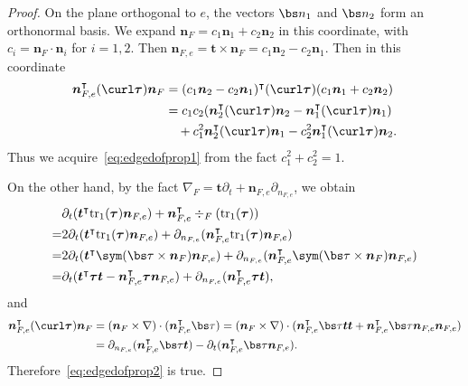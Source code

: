 \begin{proof}
On the plane orthogonal to $e$, the vectors $\bs n_1$ and $\bs n_2$ form an orthonormal basis. We expand $\boldsymbol n_F= c_1 \boldsymbol n_1+c_2\boldsymbol n_2$ in this coordinate, with $c_i = \boldsymbol n_F\cdot\boldsymbol n_i$ for $i=1,2$. Then $
\boldsymbol n_{F,e}=\boldsymbol t \times\boldsymbol n_{F}=c_1\boldsymbol n_2 - c_2 \boldsymbol n_1.$
Then in this coordinate
\begin{align*}
\boldsymbol n_{F,e}^{\intercal}(\curl\boldsymbol \tau)\boldsymbol n_F&=(c_1\boldsymbol n_2-c_2\boldsymbol n_1)^{\intercal}(\curl\boldsymbol \tau)(c_1\boldsymbol n_1+c_2\boldsymbol n_2) \\
&=c_1c_2(\boldsymbol n_{2}^{\intercal}(\curl\boldsymbol \tau)\boldsymbol n_2-\boldsymbol n_{1}^{\intercal}(\curl\boldsymbol \tau)\boldsymbol n_1) \\
&\quad+ c_1^2\boldsymbol n_{2}^{\intercal}(\curl\boldsymbol \tau)\boldsymbol n_1 - c_2^2\boldsymbol n_{1}^{\intercal}(\curl\boldsymbol \tau)\boldsymbol n_2.
\end{align*}
Thus we acquire~\eqref{eq:edgedofprop1} from the fact $c_1^2+c_2^2=1$.

On the other hand, by the fact $\nabla_F=\boldsymbol t\partial_{t}+\boldsymbol n_{F,e}\partial_{n_{F,e}}$, we obtain
\begin{align*}
&\partial_{t}(\boldsymbol t^{\intercal}{\rm tr}_1(\boldsymbol \tau)\boldsymbol  n_{F,e}) +\boldsymbol  n_{F,e}^{\intercal}\div_F({\rm tr}_1(\boldsymbol \tau)) \\
=&2\partial_{t}(\boldsymbol t^{\intercal}{\rm tr}_1(\boldsymbol \tau)\boldsymbol  n_{F,e}) + \partial_{n_{F,e}}(\boldsymbol  n_{F,e}^{\intercal} {\rm tr}_1(\boldsymbol \tau)\boldsymbol n_{F,e}) \\
=&2\partial_{t}(\boldsymbol  t^{\intercal} \sym(\bs\tau\times\boldsymbol n_F)\boldsymbol  n_{F,e}) + \partial_{n_{F,e}}(\boldsymbol  n_{F,e}^{\intercal} \sym(\bs\tau\times\boldsymbol n_F)\boldsymbol  n_{F,e}) \\
=&\partial_{t}(\boldsymbol t^{\intercal}\boldsymbol\tau\boldsymbol  t - \boldsymbol  n_{F,e}^{\intercal}\boldsymbol\tau\boldsymbol  n_{F,e}) + \partial_{n_{F,e}}(\boldsymbol n_{F,e}^{\intercal}\boldsymbol\tau\boldsymbol t),
\end{align*}
and
\begin{align*}
\boldsymbol n_{F,e}^{\intercal}(\curl\boldsymbol \tau)\boldsymbol n_F&=(\boldsymbol n_F\times\nabla)\cdot(\boldsymbol n_{F,e}^{\intercal}\bs\tau)=(\boldsymbol n_F\times\nabla)\cdot(\boldsymbol n_{F,e}^{\intercal}\bs\tau\boldsymbol t\boldsymbol t+\boldsymbol n_{F,e}^{\intercal}\bs\tau\boldsymbol n_{F,e}\boldsymbol n_{F,e}) \\
&=\partial_{n_{F,e}}(\boldsymbol n_{F,e}^{\intercal}\bs\tau\boldsymbol t) - \partial_{t}(\boldsymbol n_{F,e}^{\intercal}\bs\tau\boldsymbol n_{F,e}).
\end{align*}
Therefore~\eqref{eq:edgedofprop2} is true.
\end{proof}

